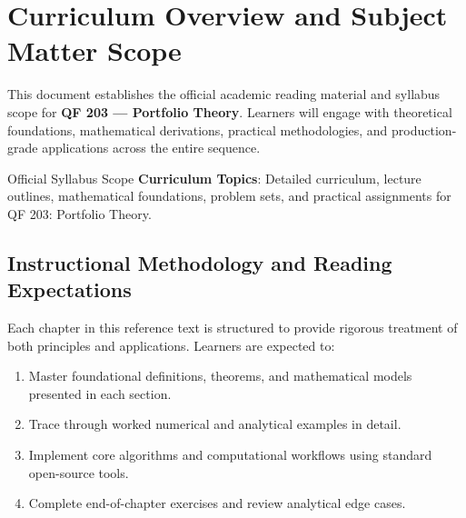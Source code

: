 \section{Curriculum Overview and Subject Matter Scope}

This document establishes the official academic reading material and syllabus scope for \textbf{QF 203 --- Portfolio Theory}. Learners will engage with theoretical foundations, mathematical derivations, practical methodologies, and production-grade applications across the entire sequence.

\begin{InsightBox}{Official Syllabus Scope}
  \textbf{Curriculum Topics}: Detailed curriculum, lecture outlines, mathematical foundations, problem sets, and practical assignments for QF 203: Portfolio Theory.
\end{InsightBox}

\subsection{Instructional Methodology and Reading Expectations}

Each chapter in this reference text is structured to provide rigorous treatment of both principles and applications. Learners are expected to:
\begin{enumerate}
  \item Master foundational definitions, theorems, and mathematical models presented in each section.
  \item Trace through worked numerical and analytical examples in detail.
  \item Implement core algorithms and computational workflows using standard open-source tools.
  \item Complete end-of-chapter exercises and review analytical edge cases.
\end{enumerate}

